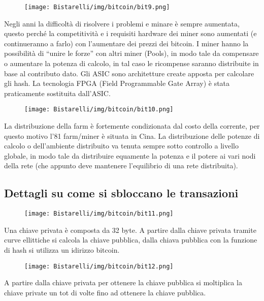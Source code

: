\begin{figure}[H]
	\centering
    \texttt{[image: Bistarelli/img/bitcoin/bit9.png]}
\end{figure}

Negli anni la difficoltà di risolvere i problemi e minare è sempre aumentata, questo perché la competitività e i
requisiti hardware dei miner sono aumentati (e continueranno a farlo) con l’aumentare dei prezzi dei bitcoin. I
miner hanno la possibilità di “unire le forze” con altri miner (Pools), in modo tale da compensare o aumentare la
potenza di calcolo, in tal caso le ricompense saranno distribuite in base al contributo dato.
Gli ASIC sono architetture create apposta per calcolare gli hash.
La tecnologia FPGA (Field Programmable Gate Array) è stata praticamente sostituita dall’ASIC.

\begin{figure}[H]
	\centering
    \texttt{[image: Bistarelli/img/bitcoin/bit10.png]}
\end{figure}

La distribuzione della farm è fortemente condizionata dal costo della corrente, per questo motivo l’81%
farm/miner è situata in Cina. La distribuzione delle potenze di calcolo o dell’ambiente distribuito va tenuta sempre
sotto controllo a livello globale, in modo tale da distribuire equamente la potenza e il potere ai vari nodi della rete
(che appunto deve mantenere l’equilibrio di una rete distribuita).

\subsection{Dettagli su come si sbloccano le transazioni}

\begin{figure}[H]
	\centering
    \texttt{[image: Bistarelli/img/bitcoin/bit11.png]}
\end{figure}

Una chiave privata è composta da 32 byte. A partire dalla chiave privata tramite curve ellittiche si calcola la chiave
pubblica, dalla chiava pubblica con la funzione di hash si utilizza un idirizzo bitcoin.

\begin{figure}[H]
	\centering
    \texttt{[image: Bistarelli/img/bitcoin/bit12.png]}
\end{figure}

A partire dalla chiave privata per ottenere la chiave pubblica si moltiplica la chiave private un tot di volte fino ad
ottenere la chiave pubblica.

